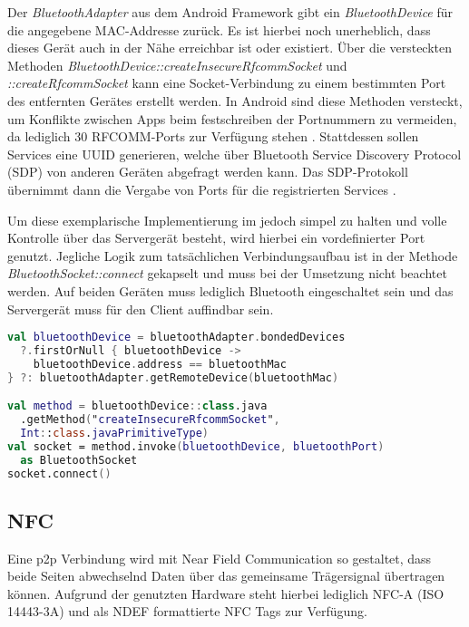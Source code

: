         Der {\it BluetoothAdapter} aus dem Android Framework gibt ein {\it BluetoothDevice} für die angegebene MAC-Addresse zurück. Es ist hierbei noch unerheblich, dass dieses Gerät auch in der Nähe erreichbar ist oder existiert. Über die versteckten Methoden {\it BluetoothDevice::createInsecureRfcommSocket} und {\it ::createRfcommSocket} kann eine Socket-Verbindung zu einem bestimmten Port des entfernten Gerätes erstellt werden. In Android sind diese Methoden versteckt, um Konflikte zwischen Apps beim festschreiben der Portnummern zu vermeiden, da lediglich 30 RFCOMM-Ports zur Verfügung stehen \cite{bluezRfcomm}. Stattdessen sollen Services eine UUID generieren, welche über Bluetooth Service Discovery Protocol (SDP) von anderen Geräten abgefragt werden kann. Das SDP-Protokoll übernimmt dann die Vergabe von Ports für die registrierten Services \cite{androidBluetooth}.
        
        Um diese exemplarische Implementierung im  jedoch simpel zu halten und volle Kontrolle über das Servergerät besteht, wird hierbei ein vordefinierter Port genutzt. Jegliche Logik zum tatsächlichen Verbindungsaufbau ist in der Methode {\it BluetoothSocket::connect} gekapselt und muss bei der Umsetzung nicht beachtet werden. Auf beiden Geräten muss lediglich Bluetooth eingeschaltet sein und das Servergerät muss für den Client auffindbar sein.
        
        \begin{lstlisting}[frame=bt, label={lst:android:bluetooth}, language=Kotlin, caption=Verbindungsaufbau mit Bluetooth (Clientcode in Kotlin)]
val bluetoothDevice = bluetoothAdapter.bondedDevices
  ?.firstOrNull { bluetoothDevice ->
    bluetoothDevice.address == bluetoothMac
} ?: bluetoothAdapter.getRemoteDevice(bluetoothMac)

val method = bluetoothDevice::class.java
  .getMethod("createInsecureRfcommSocket",
  Int::class.javaPrimitiveType)
val socket = method.invoke(bluetoothDevice, bluetoothPort)
  as BluetoothSocket
socket.connect()
        \end{lstlisting}
         
    \subsection{NFC}
        Eine p2p Verbindung wird mit Near Field Communication so gestaltet, dass beide Seiten abwechselnd Daten über das gemeinsame Trägersignal übertragen können.  Aufgrund der genutzten Hardware steht hierbei lediglich NFC-A (ISO 14443-3A) und als NDEF formattierte NFC Tags zur Verfügung. 
        
